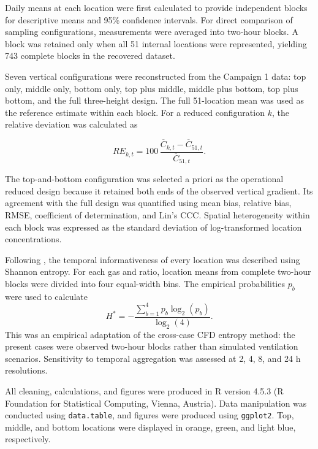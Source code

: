 \documentclass[12pt,a4paper]{article}
\begin{document}
Daily means at each location were first calculated to provide independent
blocks for descriptive means and 95\% confidence intervals. For direct
comparison of sampling configurations, measurements were averaged into
two-hour blocks. A block was retained only when all 51 internal locations
were represented, yielding 743 complete blocks in the recovered dataset.

Seven vertical configurations were reconstructed from the Campaign 1 data:
top only, middle only, bottom only, top plus middle, middle plus bottom, top
plus bottom, and the full three-height design. The full 51-location mean was
used as the reference estimate within each block. For a reduced configuration
\(k\), the relative deviation was calculated as

\begin{equation}
RE_{k,t}=100\,
\frac{\overline{C}_{k,t}-\overline{C}_{51,t}}
     {\overline{C}_{51,t}}.
\end{equation}

The top-and-bottom configuration was selected a priori as the operational
reduced design because it retained both ends of the observed vertical
gradient. Its agreement with the full design was quantified using mean bias,
relative bias, RMSE, coefficient of determination, and Lin's CCC. Spatial
heterogeneity within each block was expressed as the standard deviation of
log-transformed location concentrations.

Following \citet{Chen2026}, the temporal informativeness of every location was
described using Shannon entropy. For each gas and ratio, location means from
complete two-hour blocks were divided into four equal-width bins. The
empirical probabilities \(p_b\) were used to calculate
\begin{equation}
H^*=-\frac{\sum_{b=1}^{4}p_b\log_2(p_b)}{\log_2(4)}.
\end{equation}
This was an empirical adaptation of the cross-case CFD entropy method: the
present cases were observed two-hour blocks rather than simulated ventilation
scenarios. Sensitivity to temporal aggregation was assessed at 2, 4, 8, and
24 h resolutions.

All cleaning, calculations, and figures were produced in R version 4.5.3
(R Foundation for Statistical Computing, Vienna, Austria). Data manipulation
was conducted using \texttt{data.table}, and figures were produced using
\texttt{ggplot2}. Top, middle, and bottom locations were displayed in orange,
green, and light blue, respectively.
\end{document}

